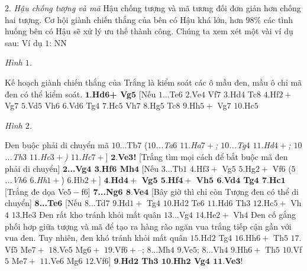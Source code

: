 \begin{multicols}{2}
	$2.$ \textit{Hậu chống tượng và mã}
	\vskip 0.1cm 
	Hậu chống tượng và mã tương đối đơn giản hơn chống hai tượng. Cơ hội giành chiến thắng của bên có Hậu khá lớn, hơn $98\%$ các tình huống bên có Hậu sẽ xử lý ưu thế thành công.
	\vskip 0.1cm
	Chúng ta xem xét một vài ví dụ sau:
	\vskip 0.1cm
	Ví dụ $1$: NN
	\begin{center}
		\newgame
		\showboard
		\vskip 0.1cm
		\textit{\small\color{gocco}Hình $1$.}
	\end{center}
	Kế hoạch giành chiến thắng của Trắng là kiểm soát các ô mầu đen, mầu ô chỉ mã đen có thể kiểm soát.
	\vskip 0.1cm
	$\pmb{1.}$\textbf{\color{gocco}Hd$\pmb{6}$+ Vg}$\pmb{5}$ [Nếu $1$...Te$6$ $2.$Ve$4$ Vf$7$ $3.$Hd$4$ Tc$8$ $4.$Hf$2+$ Vg$7$ $5.$Vd$5$ Vh$6$ $6.$Vd$6$ Tg$4$ $7.$Hc$5$ Vh$7$ $8.$Hg$5$ Tc$8$ $9.$Hh$5+$ Vg$7$ $10.$Hc$5$ 
	\begin{center}
		\newgame
		\showboard
		\vskip 0.1cm
		\textit{\small\color{gocco}Hình $2$.}
	\end{center}
	Đen buộc phải di chuyển mã $10$...Tb$7$ ($10$\textit{...Ta$6$ $11.$Ha$7+$; $10$...Tg$4$ $11.$Hd$4+$; $10$...Th$3$ $11.$Hc$3+$) $11.$Hc$7+$}]
	\vskip 0.1cm
	$\pmb{2.}$\textbf{\color{gocco}Ve$\pmb{3}$!} [Trắng tìm mọi cách để bắt buộc mã đen phải di chuyển]
	\vskip 0.1cm
	$\pmb{2}$\textbf{\color{gocco}...Vg$\pmb{4}$ $\pmb{3.}$Hf$\pmb{6}$ Mh$\pmb{4}$} [Nếu $3$...Tb$1$ $4.$Hf$3+$ Vg$5$ $5.$Hg$2+$ Vf$6$ (\textit{$5$...Vh$6$ $6$.Hh$1+$}) $6.$Hb$2+$]
	\vskip 0.1cm
	$\pmb{4.}$\textbf{\color{gocco}Hd$\pmb{4+}$ Vg$\pmb{5}$ $\pmb{5.}$Hf$\pmb{4+}$ Vh$\pmb{5}$ $\pmb{6.}$Vd$\pmb{4}$ Tg$\pmb{4}$ $\pmb{7.}$Hc}$\pmb{1}$ [Trắng đe dọa Ve$5-$f$6$]
	\vskip 0.1cm
	$\pmb{7}$\textbf{\color{gocco}...Ng$\pmb{6}$ $\pmb{8.}$Ve}$\pmb{4}$ [Bây giờ thì chỉ còn Tượng đen có thể di chuyển]
	\vskip 0.1cm
	$\pmb{8}$\textbf{\color{gocco}...Te}$\pmb{6}$ [Nếu $8$...Td$7$ $9$.Hd$1+$ Tg$4$ $10$.Hd$2$ Te$6$ $11.$Hd$6$ Th$3$ $12.$Hc$5+$ Vh$4$ $13.$He$3$ Đen rất kho tránh khỏi mất quân $13$...Vg$4$ $14.$He$2+$ Vh$4$ Đen cố gắng phối hơp giữa tượng và mã để tạo ra hàng rào ngăn vua trắng tiếp cận gần với vua đen. Tuy nhiên, đen khó tránh khỏi mất quân $15.$Hd$2$ Tg$4$ $16.$Hh$6+$ Th$5$ $17.$Vf$5$ Me$7+$ $18.$Ve$5$ Mg$6+$ $19.$Vf$6+–$; $8$...Mh$4$ $9$.Ve$5$; $8$...Vh$4$ $9.$Hh$6+$ Th$5$ $10.$Vf$5$ Me$7+$ $11.$Ve$6$ Mg$6$ $12.$Vf$6$]
	\vskip 0.1cm
	$\pmb{9.}$\textbf{\color{gocco}Hd$\pmb{2}$ Th$\pmb{3}$ $\pmb{10.}$Hh$\pmb{2}$ Vg$\pmb{4}$ $\pmb{11.}$Ve}$\pmb{3!}$ 

\end{multicols}
